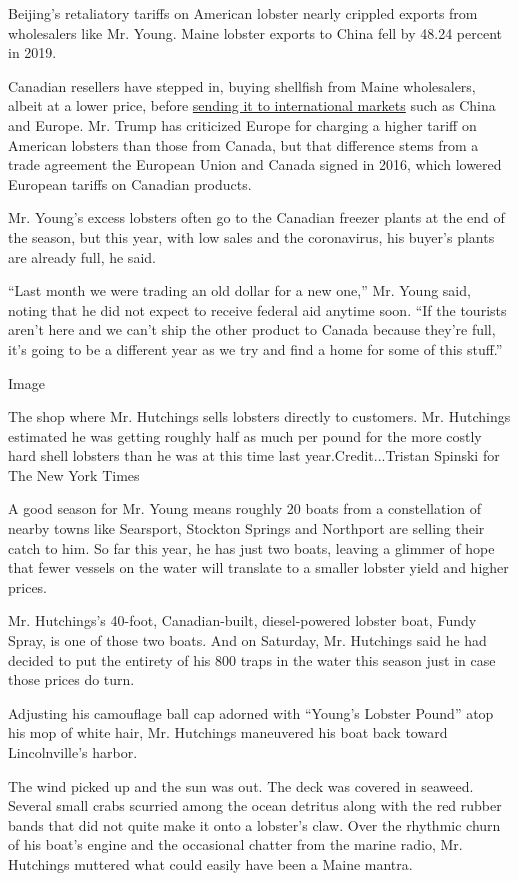 Beijing's retaliatory tariffs on American lobster nearly crippled
exports from wholesalers like Mr. Young. Maine lobster exports to China
fell by 48.24 percent in 2019.

Canadian resellers have stepped in, buying shellfish from Maine
wholesalers, albeit at a lower price, before
\href{https://www.nytimes3xbfgragh.onion/2017/11/12/business/trump-trade-lobster-canada.html}{sending
it to international markets} such as China and Europe. Mr. Trump has
criticized Europe for charging a higher tariff on American lobsters than
those from Canada, but that difference stems from a trade agreement the
European Union and Canada signed in 2016, which lowered European tariffs
on Canadian products.

Mr. Young's excess lobsters often go to the Canadian freezer plants at
the end of the season, but this year, with low sales and the
coronavirus, his buyer's plants are already full, he said.

``Last month we were trading an old dollar for a new one,'' Mr. Young
said, noting that he did not expect to receive federal aid anytime soon.
``If the tourists aren't here and we can't ship the other product to
Canada because they're full, it's going to be a different year as we try
and find a home for some of this stuff.''

Image

The shop where Mr. Hutchings sells lobsters directly to customers. Mr.
Hutchings estimated he was getting roughly half as much per pound for
the more costly hard shell lobsters than he was at this time last
year.Credit...Tristan Spinski for The New York Times

A good season for Mr. Young means roughly 20 boats from a constellation
of nearby towns like Searsport, Stockton Springs and Northport are
selling their catch to him. So far this year, he has just two boats,
leaving a glimmer of hope that fewer vessels on the water will translate
to a smaller lobster yield and higher prices.

Mr. Hutchings's 40-foot, Canadian-built, diesel-powered lobster boat,
Fundy Spray, is one of those two boats. And on Saturday, Mr. Hutchings
said he had decided to put the entirety of his 800 traps in the water
this season just in case those prices do turn.

Adjusting his camouflage ball cap adorned with ``Young's Lobster Pound''
atop his mop of white hair, Mr. Hutchings maneuvered his boat back
toward Lincolnville's harbor.

The wind picked up and the sun was out. The deck was covered in seaweed.
Several small crabs scurried among the ocean detritus along with the red
rubber bands that did not quite make it onto a lobster's claw. Over the
rhythmic churn of his boat's engine and the occasional chatter from the
marine radio, Mr. Hutchings muttered what could easily have been a Maine
mantra.

